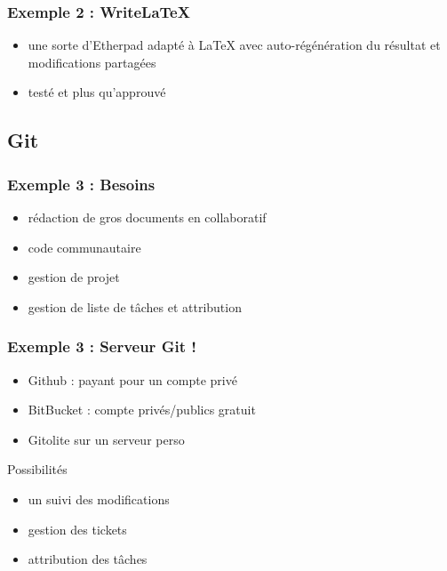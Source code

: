 \documentclass{beamer}
\begin{document}
\begin{frame}
    \frametitle{Exemple 2 : Write\LaTeX{}}

    \begin{itemize}
        \item une sorte d'Etherpad adapté à LaTeX avec auto-régénération du résultat et modifications partagées
        \item testé et plus qu'approuvé
    \end{itemize}

\end{frame}


\subsection{Git} %

\begin{frame}
    \frametitle{Exemple 3 : Besoins}

    \begin{itemize}
        \item rédaction de gros documents en collaboratif
        \item code communautaire
        \item gestion de projet
        \item gestion de liste de tâches et attribution
    \end{itemize}

\end{frame}

\begin{frame}
    \frametitle{Exemple 3 : Serveur Git !}

    \begin{itemize}
        \item Github : payant pour un compte privé
        \item BitBucket : compte privés/publics gratuit
        \item Gitolite sur un serveur perso
    \end{itemize}

    \pause

    \begin{block}{Possibilités}

        \begin{itemize}
            \item un suivi des modifications
            \item gestion des tickets
            \item attribution des tâches
        \end{itemize}
    \end{block}

\end{frame}
\end{document}
